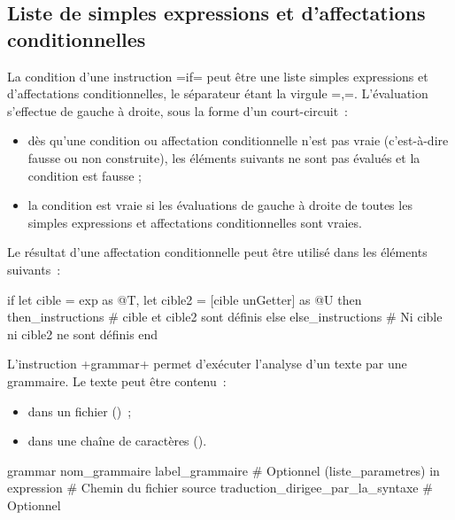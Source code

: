 \subsection{Liste de simples expressions et d'affectations conditionnelles}

La condition d'une instruction \ggst=if= peut être une liste simples expressions et d'affectations conditionnelles, le séparateur étant la virgule \ggst=,=. L'évaluation s'effectue de gauche à droite, sous la forme d'un court-circuit~:
\begin{itemize}
\item dès qu'une condition ou affectation conditionnelle n'est pas vraie (c'est-à-dire fausse ou non construite), les éléments suivants ne sont pas évalués et la condition est fausse ;
\item la condition est vraie si les évaluations de gauche à droite de toutes les simples expressions et affectations conditionnelles sont vraies.
\end{itemize}

Le résultat d'une affectation conditionnelle peut être utilisé dans les éléments suivants~:
\begin{galgas3}
if let cible = exp as @T, let cible2 = [cible unGetter] as @U then
  then_instructions # cible et cible2 sont définis
else
  else_instructions # Ni cible ni cible2 ne sont définis
end
\end{galgas3}








L'instruction \ggst+grammar+ permet d'exécuter l'analyse d'un texte par une grammaire. Le texte peut être contenu~:
\begin{itemize}
  \item dans un fichier ()~;
  \item dans une chaîne de caractères ().
\end{itemize}











\begin{galgas3box}
grammar
  nom_grammaire
  label_grammaire # Optionnel
  (liste_parametres)
  in expression # Chemin du fichier source
  traduction_dirigee_par_la_syntaxe # Optionnel
\end{galgas3box}

